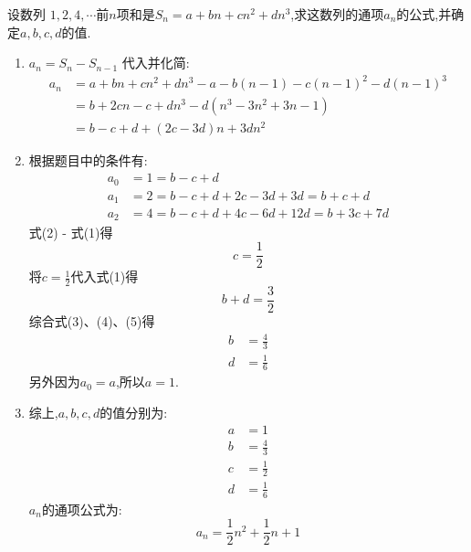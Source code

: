 \documentclass[answers]{exam}
\begin{document}
\begin{questions}
	\question 设数列 $1,2,4, \cdots$前$n$项和是$S_n = a + bn + cn^2 +
		dn^3$,求这数列的通项$a_n$的公式,并确定$a,b,c,d$的值.
	\begin{solution}
		\begin{enumerate}[label=\arabic*.]
			\item $a_n = S_n - S_{n-1}$
			      代入并化简:
			      \begin{align*}
				      a_n & = a + bn + cn^2 + dn^3 - a - b(n-1) - c(n-1)^2 - d(n-1)^3 \\
				          & = b + 2cn -c + dn^3 -d(n^3 -3n^2 + 3n - 1)                \\
				          & = b - c + d + (2c - 3d)n + 3dn^2
			      \end{align*}
			\item 根据题目中的条件有:
			      \begin{align*}
				      a_0 & = 1 = b - c + d \tag{1}                               \\
				      a_1 & = 2 = b - c + d + 2c - 3d + 3d = b + c + d\tag{2}     \\
				      a_2 & = 4 = b - c + d + 4c - 6d + 12d = b + 3c + 7d \tag{3}
			      \end{align*}
			      式(2) - 式(1)得 \[c=\frac12 \tag{4}\]
			      将$c=\frac12$代入式(1)得 \[b+d=\frac32\tag{5}\]
			      综合式(3)、(4)、(5)得
			      \begin{align*}
				      b & = \frac43 \\
				      d & = \frac16
			      \end{align*}
			      另外因为$a_0 = a$,所以$a=1$.
			\item 综上,$a,b,c,d$的值分别为:
			      \begin{align*}
				      a & = 1       \\
				      b & = \frac43 \\
				      c & = \frac12 \\
				      d & = \frac16
			      \end{align*}
			      $a_n$的通项公式为:
			      \begin{equation*}
				      a_n = \frac12n^2 + \frac12n + 1
			      \end{equation*}

		\end{enumerate}

	\end{solution}
	\begin{center}

\end{center}
\end{questions}
\end{document}
